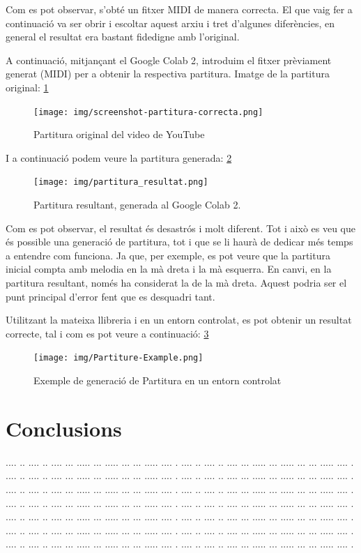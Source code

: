 \documentclass[10pt,a4paper,twocolumn,twoside]{article}
\begin{document}
Com es pot observar, s'obté un fitxer MIDI de manera correcta. El que vaig fer a continuació va ser obrir i escoltar aquest arxiu i tret d'algunes diferències, en general el resultat era bastant fidedigne amb l'original.

A continuació, mitjançant el Google Colab 2, introduim el fitxer prèviament generat (MIDI) per a obtenir la respectiva partitura.
Imatge de la partitura original: \ref{fig:paritura-original}
\begin{figure}
    \centering
    \texttt{[image: img/screenshot-partitura-correcta.png]}
    \caption{Partitura original del video de YouTube}
    \label{fig:paritura-original}
\end{figure}

I a continuació podem veure la partitura generada: \ref{fig:partitura-resultat}
\begin{figure}
    \centering
    \texttt{[image: img/partitura\_resultat.png]}
    \caption{Partitura resultant, generada al Google Colab 2.}
    \label{fig:partitura-resultat}
\end{figure}

Com es pot observar, el resultat és desastrós i molt diferent. Tot i això es veu que és possible una generació de partitura, tot i que se li haurà de dedicar més temps a entendre com funciona. Ja que, per exemple, es pot veure que la partitura inicial compta amb melodia en la mà dreta i la mà esquerra. En canvi, en la partitura resultant, només ha considerat la de la mà dreta. Aquest podria ser el punt principal d'error fent que es desquadri tant.

Utilitzant la mateixa llibreria i en un entorn controlat, es pot obtenir un resultat correcte, tal i com es pot veure a continuació: \ref{fig:partiture-example}
\begin{figure}
    \centering
    \texttt{[image: img/Partiture-Example.png]}
    \caption{Exemple de generació de Partitura en un entorn controlat}
    \label{fig:partiture-example}
\end{figure}

\section{Conclusions}

.... ..  .... .. .... ... ..... ... ..... ... ... ..... .... .
.... ..  .... .. .... ... ..... ... ..... ... ... ..... .... .
.... ..  .... .. .... ... ..... ... ..... ... ... ..... .... .
.... ..  .... .. .... ... ..... ... ..... ... ... ..... .... .
.... ..  .... .. .... ... ..... ... ..... ... ... ..... .... .
.... ..  .... .. .... ... ..... ... ..... ... ... ..... .... .
.... ..  .... .. .... ... ..... ... ..... ... ... ..... .... .
.... ..  .... .. .... ... ..... ... ..... ... ... ..... .... .
.... ..  .... .. .... ... ..... ... ..... ... ... ..... .... .
.... ..  .... .. .... ... ..... ... ..... ... ... ..... .... .
.... ..  .... .. .... ... ..... ... ..... ... ... ..... .... .
.... ..  .... .. .... ... ..... ... ..... ... ... ..... .... .
.... ..  .... .. .... ... ..... ... ..... ... ... ..... .... .
.... ..  .... .. .... ... ..... ... ..... ... ... ..... .... .
\end{document}
